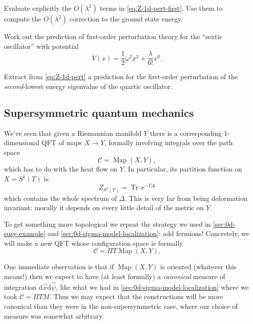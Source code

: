 \documentclass[12pt,letterpaper,reqno]{article}
\numberwithin{equation}{section}
\newcommand{\cC}{\ensuremath{\mathcal C}}
\newcommand{\half}{\ensuremath{\frac{1}{2}}}
\newcommand{\e}{{\mathrm e}}
\newcommand{\de}{\mathrm{d}}
\newcommand{\ti}[1]{\textit{#1}}
\DeclareMathOperator{\Tr}{Tr}
\DeclareMathOperator{\Map}{Map}
\newcommand{\fixme}[1]{{\color{orange}{[#1]}}}
\begin{document}
\begin{exercise} Evaluate explicitly the $O(\lambda^2)$
terms in \eqref{eq:Z-1d-pert-first}. Use them to compute
the $O(\lambda^2)$ correction to the ground state
energy.
\end{exercise}

\begin{exercise} Work out the prediction of first-order perturbation
theory for the ``sextic oscillator'' with potential
\begin{equation}
	V(x) = \half \omega^2 x^2 + \frac{\lambda}{6!} x^6.
\end{equation}
\end{exercise}


\begin{exercise} Extract from \eqref{eq:Z-1d-pert} a prediction
for the first-order perturbation of the \ti{second}-lowest
energy eigenvalue of the quartic oscillator.
\end{exercise}


\fixme{perturbation theory for heat kernel?}


\subsection{Supersymmetric quantum mechanics}

We've seen that given a Riemannian manifold $Y$ there is a corresponding
$1$-dimensional QFT of maps $X \to Y$, formally involving integrals
over the path space
\begin{equation}
  \cC = \Map(X,Y),
\end{equation}
which has to do with the heat flow on $Y$.
In particular, its partition function on $X = S^1(T)$ is
\begin{equation}
  Z_{S^1(T)} = \Tr \, \e^{-T \Delta}
\end{equation}
which contains the whole spectrum of $\Delta$. This is very far
from being deformation invariant: morally it depends on every little
detail of the metric on $Y$.

To get something more topological we repeat the strategy we used
in \autoref{sec:0d-susy-example} and \autoref{sec:0d-sigma-model-localization}: add fermions!
Concretely, we will make a new QFT whose configuration space is formally
\begin{equation}
  \cC = \Pi T \Map(X,Y).
\end{equation}

One immediate observation is that if $\Map(X,Y)$ is oriented
(whatever this means!)
then we expect to have (at least formally) a \ti{canonical}
measure of integration $\de \vec{x} \de \vec{\psi}$, 
like what we had in \autoref{sec:0d-sigma-model-localization} 
where we took $\cC = \Pi T M$.
Thus we may expect that the constructions will be more canonical than
they were in the non-supersymmetric case, where our choice of
measure was somewhat arbitrary.
\end{document}

